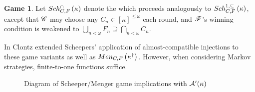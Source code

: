 \documentclass{amsart}
\theoremstyle{plain}
\theoremstyle{definition}
\newtheorem{game}[theorem]{Game}
\theoremstyle{remark}
\theoremstyle{plain}
\theoremstyle{definition}
\theoremstyle{remark}
\begin{document}
  \begin{game}
    Let \(Sch^{\cap}_{C,F}\left({\kappa}\right)\) denote the
     which proceeds analogously
    to \(Sch^{1,\subseteq}_{C,F}\left({\kappa}\right)\), except that \(\mathscr{C}\) may choose any
    \(C_n\in[\kappa]^{\leq\omega}\) each round, and \(\mathscr{F}\)'s winning condition
    is weakened to
    \(\bigcup_{n<\omega}F_n\supseteq\bigcap_{n<\omega}C_n\).
  \end{game}

  In \cite{clontzMengerGamePreprint} Clontz extended Scheepers' application of
  almost-compatible injections to these game variants as well as
  \(Men_{C,F}\left({\kappa^\dagger}\right)\). However, when considering Markov strategies,
  finite-to-one functions suffice.

  \begin{figure}[h]
\begin{center}
\end{center}
\caption{Diagram of Scheeper/Menger game implications with \(\mathcal{A}'(\kappa)\)}
\label{GamesDiagram2}
\end{figure}


\end{document}
